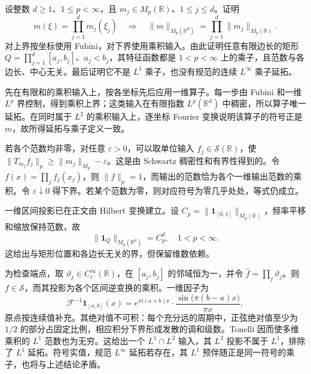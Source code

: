 \begin{exercise}\label{b2:ex:22-new-4}
设整数 \(d\geq1\)、\(1\leq p<\infty\)，且 \(m_j\in M_p(\mathbb R)\)、\(1\leq j\leq d\)。证明
\[
 m(\xi)=\prod_{j=1}^dm_j(\xi_j)
 \quad\Longrightarrow\quad
 \|m\|_{M_p(\mathbb R^d)}
       =\prod_{j=1}^d\|m_j\|_{M_p(\mathbb R)}.
\]
对上界按坐标使用 Fubini，对下界使用乘积输入。由此证明任意有限边长的矩形
\(Q=\prod_{j=1}^d[a_j,b_j]\)、\(a_j<b_j\)，其特征函数都是 \(1<p<\infty\) 上的乘子，且范数与各边长、中心无关。最后证明它不是 \(L^1\) 乘子，也没有规范的\WeakStar{}连续 \(L^\infty\) 乘子延拓。
\end{exercise}
\begin{solution}
先在有限和的乘积输入上，按各坐标先后应用一维算子。每一步由 Fubini 和一维 \(L^p\) 界控制，得到乘积上界；这类输入在有限指数 \(L^p(\mathbb R^d)\) 中稠密，所以算子唯一延拓。在同时属于 \(L^2\) 的乘积输入上，逐坐标 Fourier 变换说明该算子的符号正是 \(m\)，故所得延拓与乘子定义一致。

若各个范数均非零，对任意 \(\varepsilon>0\)，可以取单位输入 \(f_j\in\mathcal S(\mathbb R)\)，使
\(\|T_{m_j}f_j\|_p\geq\|m_j\|_{M_p}-\varepsilon\)。这是由 Schwartz 稠密性和有界性得到的。令 \(f(x)=\prod_jf_j(x_j)\)，则 \(\|f\|_p=1\)，而输出的范数恰为各个一维输出范数的乘积。令 \(\varepsilon\downarrow0\) 得下界。若某个范数为零，则对应符号为零几乎处处，等式仍成立。

一维区间投影已在正文由 Hilbert 变换建立。设 \(C_p=\|\mathbf1_{[0,1]}\|_{M_p(\mathbb R)}\)，频率平移和缩放保持范数，故
\[
 \|\mathbf1_Q\|_{M_p(\mathbb R^d)}=C_p^d,
 \quad1<p<\infty.
\]
这给出与矩形位置和各边长无关的界，但保留维数依赖。

为检查端点，取 \(\vartheta_j\in C_c^\infty(\mathbb R)\)，在 \([a_j,b_j]\) 的邻域恒为一，并令 \(\widehat f=\prod_j\vartheta_j\)。则 \(f\in\mathcal S\)，而其投影为各个区间逆变换的乘积。一维因子为
\[
 \mathcal F^{-1}\mathbf1_{[a,b]}(x)
 =e^{\pi\mathrm i(a+b)x}\cdot
       \frac{\sin\bigl(\pi(b-a)x\bigr)}{\pi x},
\]
原点按连续值补充。其绝对值不可积：每个充分远的周期中，正弦绝对值至少为 \(1/2\) 的部分占固定比例，相应积分下界形成发散的调和级数。Tonelli 因而使多维乘积的 \(L^1\) 范数也为无穷。这给出一个 \(L^1\cap L^2\) 输入，其 \(L^2\) 投影不属于 \(L^1\)，排除了 \(L^1\) 延拓。符号实值，规范 \(L^\infty\) 延拓若存在，其 \(L^1\) 预伴随正是同一符号的乘子，也将与上述结论矛盾。
\end{solution}

